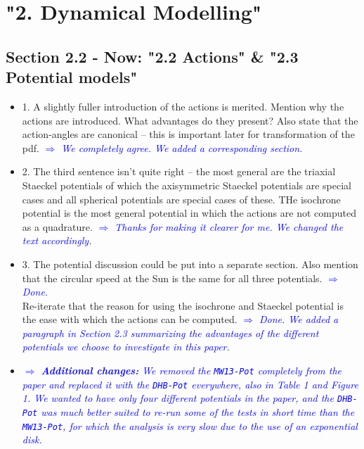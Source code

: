 \documentclass[10pt,a4paper]{article}
\newcommand{\Comment}[1]{\textsl{\textcolor{Blue}{$\Longrightarrow$ {#1}}}}
\begin{document}
\section{"2. Dynamical Modelling"}

\subsection{Section 2.2 - Now: "2.2 Actions" \& "2.3 Potential models"}
\begin{itemize}
\item 1. A slightly fuller introduction of the actions is merited. Mention why the actions are introduced. What advantages do they present? Also state that the action-angles are canonical -- this is important later for transformation of the pdf. \Comment{We completely agree. We added a corresponding section.}
\item 2. The third sentence isn't quite right -- the most general are the triaxial Staeckel potentials of which the axisymmetric Staeckel potentials are special cases and all spherical potentials are special cases of these. THe isochrone potential is the most general potential in which the actions are not computed as a quadrature. \Comment{Thanks for making it clearer for me. We changed the text accordingly.}
\item 3. The potential discussion could be put into a separate section. Also mention that the circular speed at the Sun is the same for all three potentials. \Comment{Done.} \\
Re-iterate that the reason for using the isochrone and Staeckel potential is the ease with which the actions can be computed. \Comment{Done. We added a paragraph in Section 2.3 summarizing the advantages of the different potentials we choose to investigate in this paper.}
\item \Comment{\textbf{Additional changes:} We removed the \texttt{MW13-Pot} completely from the paper and replaced it with the \texttt{DHB-Pot} everywhere, also in Table 1 and Figure 1. We wanted to have only four different potentials in the paper, and the \texttt{DHB-Pot} was much better suited to re-run some of the tests in short time than the \texttt{MW13-Pot}, for which the analysis is very slow due to the use of an exponential disk.}
\end{itemize}
\end{document}
